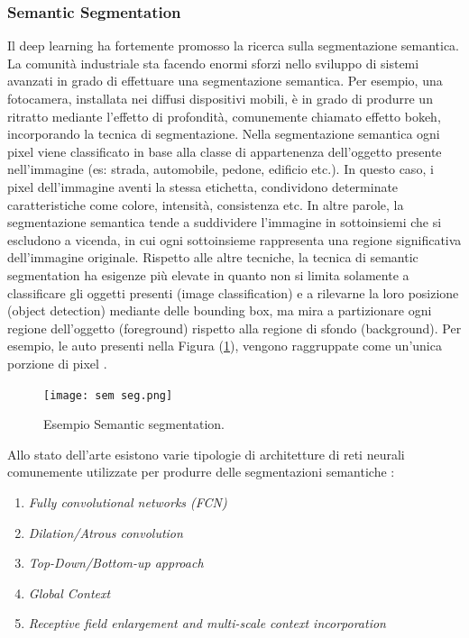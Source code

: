 \subsubsection{Semantic Segmentation}
Il deep learning ha fortemente promosso la ricerca sulla segmentazione 
semantica. La comunità industriale sta facendo enormi sforzi nello sviluppo 
di sistemi avanzati in grado di effettuare una segmentazione semantica. 
Per esempio, una fotocamera, installata nei diffusi dispositivi mobili, è in 
grado di produrre un ritratto mediante l'effetto di profondità, comunemente 
chiamato effetto bokeh, incorporando la tecnica di segmentazione. Nella 
segmentazione semantica ogni pixel viene classificato in base alla classe 
di appartenenza dell'oggetto presente nell'immagine (es: strada, automobile, 
pedone, edificio etc.). In questo caso, i pixel dell'immagine aventi 
la stessa etichetta, condividono determinate caratteristiche come colore, 
intensità, consistenza etc. In altre parole, la segmentazione semantica tende 
a suddividere l'immagine in sottoinsiemi che si escludono a vicenda, in 
cui ogni sottoinsieme rappresenta una regione significativa dell'immagine 
originale. Rispetto alle altre tecniche, la tecnica di semantic segmentation 
ha esigenze più elevate in quanto non si limita solamente a classificare gli 
oggetti presenti (image classification) e a rilevarne la loro posizione (object 
detection) mediante delle bounding box, ma mira a partizionare ogni regione 
dell'oggetto (foreground) rispetto alla regione di sfondo (background). Per 
esempio, le auto presenti nella Figura (\ref{semantic segmentation}), vengono raggruppate come 
un'unica porzione di pixel \cite{aurelien}.
\begin{figure}
    \centering
    \texttt{[image: sem seg.png]}
    \centering
    \caption{Esempio Semantic segmentation.}
    \label{semantic segmentation}
\end{figure}
Allo stato dell'arte esistono varie tipologie 
di architetture di reti neurali comunemente utilizzate per produrre delle 
segmentazioni semantiche \cite{semantic_segmentation_networks}:
\begin{enumerate}
    \item \emph{Fully convolutional networks (FCN)}
    \item \emph{Dilation/Atrous convolution}
    \item \emph{Top-Down/Bottom-up approach}
    \item \emph{Global Context}
    \item \emph{Receptive field enlargement and multi-scale context incorporation}
\end{enumerate}


